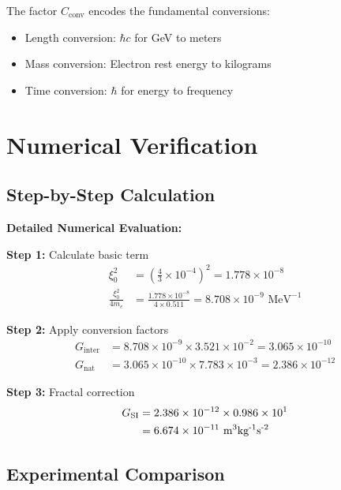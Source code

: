 	The factor $C_{\text{conv}}$ encodes the fundamental conversions:
	\begin{itemize}
		\item Length conversion: $\hbar c$ for GeV to meters
		\item Mass conversion: Electron rest energy to kilograms
		\item Time conversion: $\hbar$ for energy to frequency
	\end{itemize}
	
	\section{Numerical Verification}
	
	\subsection{Step-by-Step Calculation}
	
	\begin{verification}
		\textbf{Detailed Numerical Evaluation:}
		
		\textbf{Step 1:} Calculate basic term
		\begin{align}
			\xi_0^2 &= \left(\frac{4}{3} \times 10^{-4}\right)^2 = 1.778 \times 10^{-8} \\
			\frac{\xi_0^2}{4 m_e} &= \frac{1.778 \times 10^{-8}}{4 \times 0.511} = 8.708 \times 10^{-9} \text{ MeV}^{-1}
		\end{align}
		
		\textbf{Step 2:} Apply conversion factors
		\begin{align}
			G_{\text{inter}} &= 8.708 \times 10^{-9} \times 3.521 \times 10^{-2} = 3.065 \times 10^{-10} \\
			G_{\text{nat}} &= 3.065 \times 10^{-10} \times 7.783 \times 10^{-3} = 2.386 \times 10^{-12}
		\end{align}
		
		\textbf{Step 3:} Fractal correction
		\begin{align}
			G_{\text{SI}} &= 2.386 \times 10^{-12} \times 0.986 \times 10^{1} \\
			&= 6.674 \times 10^{-11} \text{ m\textsuperscript{3}kg\textsuperscript{-1}s\textsuperscript{-2}}
		\end{align}
	\end{verification}
	
	\subsection{Experimental Comparison}
	
